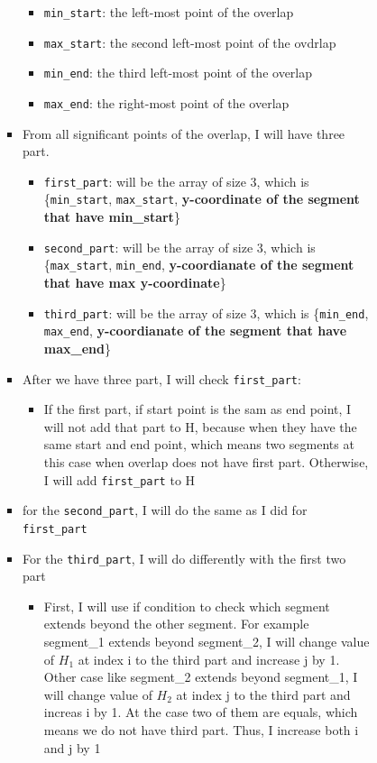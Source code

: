 \documentclass{article}
\begin{document}
\begin{enumerate}[label=({\alph*})]
\begin{enumerate}
\begin{itemize}
\begin{itemize}
\begin{itemize}
					\begin{itemize}
						\item \verb|min_start|: the left-most point of the overlap
						\item \verb|max_start|: the second left-most point of the ovdrlap
						\item \verb|min_end|: the third left-most point of the overlap
						\item \verb|max_end|: the right-most point of the overlap
					\end{itemize}
					\item From all significant points of the overlap, I will have three part. 
					\begin{itemize}
						\item \verb|first_part|: will be the array of size 3, which is \{\verb|min_start|, \verb|max_start|, \textbf{y-coordinate of the segment that have min\_start}\}
						\item \verb|second_part|: will be the array of size 3, which is \{\verb|max_start|, \verb|min_end|, \textbf{y-coordianate of the segment that have max y-coordinate}\}
						\item \verb|third_part|: will be the array of size 3, which is \{\verb|min_end|, \verb|max_end|, \textbf{y-coordianate of the segment that have max\_end}\}
					\end{itemize}
					\item After we have three part, I will check \verb|first_part|: 
					\begin{itemize}
						\item If the first part, if start point is the sam as end point, I will not add that part to H, because when they have the same start and end point, which means two segments at this case when overlap does not have first part. Otherwise, I will add \verb|first_part| to H
					\end{itemize}
					\item for the \verb|second_part|, I will do the same as I did for \verb|first_part| 
					\item For the \verb|third_part|, I will do differently with the first two part 
					\begin{itemize}
						\item First, I will use if condition to check which segment extends beyond the other segment. For example segment\_1 extends beyond segment\_2, I will change value of \(H_1\) at index i to the third part and increase j by 1. Other case like  segment\_2 extends beyond segment\_1, I will change value of \(H_2\) at index j to the third part and increas i by 1. At the case two of them are equals, which means we do not have third part. Thus, I increase both i and j by 1

\end{itemize}
\end{itemize}
\end{itemize}
\end{itemize}
\end{enumerate}
\end{enumerate}
\end{document}

